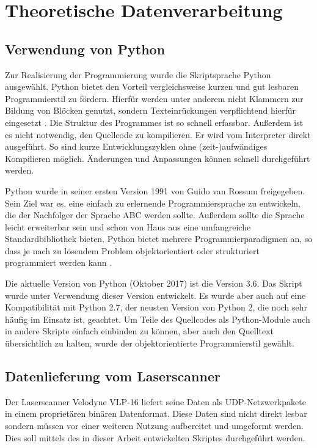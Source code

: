 \documentclass[a4paper,12pt,bibliography=totoc, listof=totoc,titlepage,pointlessnumbers]{scrreprt}
\begin{document}
\chapter{Theoretische Datenverarbeitung}
\label{c:datenverarbeitung}

\section{Verwendung von Python}
Zur Realisierung der Programmierung wurde die Skriptsprache Python ausgewählt. Python bietet den Vorteil vergleichsweise kurzen und gut lesbaren Programmierstil zu fördern. Hierfür werden unter anderem nicht Klammern zur Bildung von Blöcken genutzt, sondern Texteinrückungen verpflichtend hierfür eingesetzt \citep[S. 13f]{python}. Die Struktur des Programmes ist so schnell erfassbar. Außerdem ist es nicht notwendig, den Quellcode zu kompilieren. Er wird vom Interpreter direkt ausgeführt. So sind kurze Entwicklungszyklen ohne (zeit-)aufwändiges Kompilieren möglich. Änderungen und Anpassungen können schnell durchgeführt werden.

Python wurde in seiner ersten Version 1991 von Guido van Rossum freigegeben. Sein Ziel war es, eine einfach zu erlernende Programmiersprache zu entwickeln, die der Nachfolger der Sprache ABC werden sollte. Außerdem sollte die Sprache leicht erweiterbar sein und schon von Haus aus eine umfangreiche Standardbibliothek bieten. Python bietet mehrere Programmierparadigmen an, so dass je nach zu lösendem Problem objektorientiert oder strukturiert programmiert werden kann \citep[S. 14]{python}.

Die aktuelle Version von Python (Oktober 2017) ist die Version 3.6. Das Skript wurde unter Verwendung dieser Version entwickelt. Es wurde aber auch auf eine Kompatibilität mit Python 2.7, der neusten Version von Python 2, die noch sehr häufig im Einsatz ist, geachtet. Um Teile des Quellcodes als Python-Module auch in andere Skripte einfach einbinden zu können, aber auch den Quelltext übersichtlich zu halten, wurde der objektorientierte Programmierstil gewählt.

\section{Datenlieferung vom Laser\-scan\-ner}
\label{ss:Datenlieferung}
Der Laser\-scan\-ner Velodyne VLP-16 liefert seine Daten als UDP-Netzwerkpakete in einem proprietären binären Datenformat. Diese Daten sind nicht direkt lesbar sondern müssen vor einer weiteren Nutzung aufbereitet und umgeformt werden. Dies soll mittels des in dieser Arbeit entwickelten Skriptes durchgeführt werden.
\end{document}
